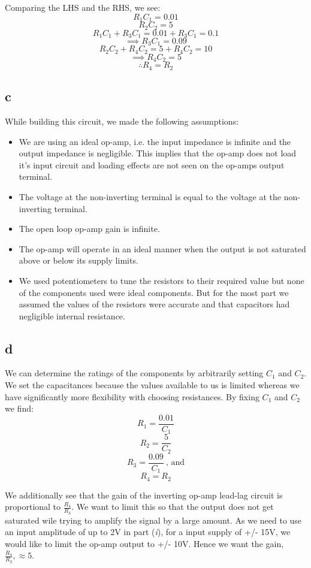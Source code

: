 \documentclass{article}
\theoremstyle{plain}
\theoremstyle{definition}
\theoremstyle{remark}
\begin{document}
Comparing the LHS and the RHS, we see:
$$R_1C_1 = 0.01$$
$$R_2C_2 = 5$$
$$R_1C_1 + R_3C_1 = 0.01 + R_3C_1 = 0.1$$
$$\implies R_3C_1 = 0.09$$
$$R_2C_2 + R_4C_2 = 5 + R_4C_2 = 10$$
$$\implies R_4C_2 = 5$$
$$\therefore R_4 = R_2$$

\subsection*{c}
While building this circuit, we made the following assumptions:
\begin{itemize}
\item We are using an ideal op-amp, i.e. the input impedance is infinite and the output impedance is negligible. This implies that the op-amp does not load it's input circuit and loading effects are not seen on the op-amps output terminal.

\item The voltage at the non-inverting terminal is equal to the voltage at the non-inverting terminal.

\item The open loop op-amp gain is infinite.

\item The op-amp will operate in an ideal manner when the output is not saturated above or below its supply limits.

\item We used potentiometers to tune the resistors to their required value but none of the components used were ideal components. But for the most part we assumed the values of the resistors were accurate and that capacitors had negligible internal resistance.

\end{itemize}

\subsection*{d}
We can determine the ratings of the components by arbitrarily setting $C_1$ and $C_2$. We set the capacitances because the values available to us is limited whereas we have significantly more flexibility with choosing resistances. By fixing $C_1$ and $C_2$ we find:
$$R_1 = \frac{0.01}{C_1}$$
$$R_2 = \frac{5}{C_2}$$
$$R_3 = \frac{0.09}{C_1} \ \text{,  and}$$
$$R_4 = R_2$$

We additionally see that the gain of the inverting op-amp lead-lag circuit is proportional to $ \frac{R_4}{R_3}$. We  want to limit this so that the output does not get saturated wile trying to amplify the signal by a large amount. As we need to use an input amplitude of up to 2V in part (\emph{i}), for a input supply of +/- 15V, we would like to limit the op-amp output to +/- 10V. Hence we want the gain,$ \frac{R_4}{R_3}, \approx 5$. 
\end{document}

